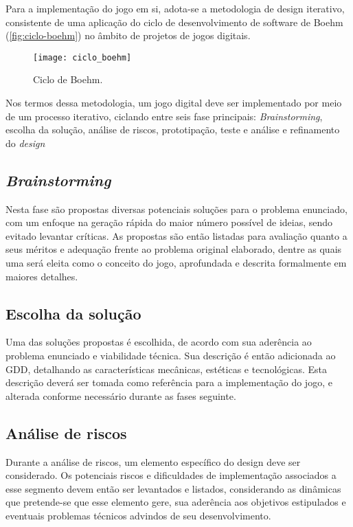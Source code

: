 Para a implementação do jogo em si, adota-se a metodologia de design iterativo,
consistente de uma aplicação do ciclo de desenvolvimento de software de 
Boehm (\autoref{fig:ciclo-boehm}) no âmbito de projetos de jogos digitais.

\begin{figure}[ht]
	\centering
	\caption{Ciclo de Boehm.}
	\texttt{[image: ciclo\_boehm]}
	\label{fig:ciclo-boehm}
\end{figure}

Nos termos dessa metodologia, um jogo digital deve ser implementado por meio de 
um processo iterativo, ciclando entre seis fase principais: \textit{Brainstorming}, 
escolha da solução, análise de riscos, prototipação, teste e análise e 
refinamento do \textit{design}

\subsection{\textit{Brainstorming}}\label{subsec-met-brainstorming}

Nesta fase são propostas diversas potenciais soluções para o problema enunciado, 
com um enfoque na geração rápida do maior número possível de ideias, sendo 
evitado levantar críticas. As propostas são então listadas para avaliação quanto 
a seus méritos e adequação frente ao problema original elaborado, dentre as 
quais uma será eleita como o conceito do jogo, aprofundada e descrita formalmente 
em maiores detalhes.

\subsection{Escolha da solução}\label{subsec-met-escolha-solucao}

Uma das soluções propostas é escolhida, de acordo com sua aderência ao 
problema enunciado e viabilidade técnica. Sua descrição é então adicionada ao 
GDD, detalhando as características mecânicas, estéticas e tecnológicas. 
Esta descrição deverá ser tomada como referência para a implementação do jogo, 
e alterada conforme necessário durante as fases seguinte.

\subsection{Análise de riscos}\label{subsec-met-analise-riscos}

Durante a análise de riscos, um elemento específico do design deve ser 
considerado. Os potenciais riscos e dificuldades de implementação associados 
a esse segmento devem então ser levantados e listados, considerando as dinâmicas 
que pretende-se que esse elemento gere, sua aderência aos objetivos estipulados 
e eventuais problemas técnicos advindos de seu desenvolvimento.

